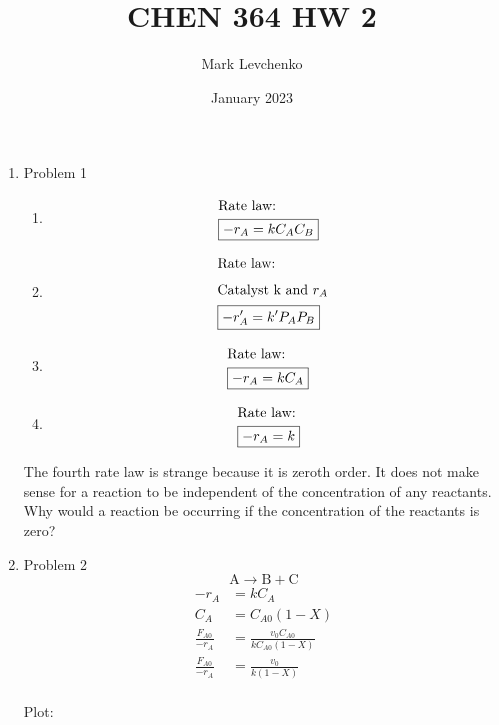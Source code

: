 \documentclass[12pt]{article}
\title{CHEN 364 HW 2}
\author{Mark Levchenko}
\date{January 2023}
\begin{document}
\begin{enumerate}
\newpage
    \item Problem 1
    \begin{enumerate}
        \item
        \begin{align*}
            \intertext{Rate law:}
            \Aboxed{-r_A = k C_A C_B}
        \end{align*}
        \item
        \begin{align*}
            \intertext{Rate law:}
            \intertext{Catalyst k and $r_A$}
            \Aboxed{-r_A' &= k' P_A P_B}
        \end{align*}
        \item
        \begin{align*}
            \intertext{Rate law:}
            \Aboxed{-r_A = k C_A}
        \end{align*}
        \item
        \begin{align*}
            \intertext{Rate law:}
            \Aboxed{-r_A = k}
        \end{align*}
    \end{enumerate}

    The fourth rate law is strange because it is zeroth order. It does not make sense for a reaction to be independent of the concentration of any reactants. Why would a reaction be occurring if the concentration of the reactants is zero?

\newpage
    \item Problem 2
    \begin{equation*}
        \mathrm{A} \rightarrow \mathrm{B} + \mathrm{C}
    \end{equation*}
    \begin{align*}
        -r_A &= k C_A \\
        C_A &= C_{A0} (1 - X) \\
        \frac{F_{A0}}{-r_A} &= \frac{v_0 C_{A0}}{k C_{A0} (1 - X)} \\
        \frac{F_{A0}}{-r_A} &= \frac{v_0 }{k (1 - X)} \\
    \end{align*}

    Plot:
    

\end{enumerate}
\end{document}
